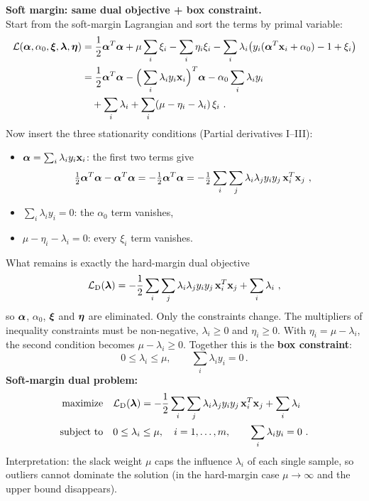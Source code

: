   \medskip
  \textbf{Soft margin: same dual objective + box constraint.} \\
  Start from the soft-margin Lagrangian and sort the terms by primal variable:
  {\small
  \begin{align*}
    \mathcal L(\bm{\mathrm{\alpha}},\alpha_0,\bm{\mathrm{\xi}},\bm{\mathrm{\lambda}},\bm{\mathrm{\eta}})
    &= \frac12\bm{\mathrm{\alpha}}^T\bm{\mathrm{\alpha}} + \mu\sum_i\xi_i - \sum_i\eta_i\xi_i - \sum_i\lambda_i\big(y_i(\bm{\mathrm{\alpha}}^T\bm{\mathrm{x}}_i+\alpha_0)-1+\xi_i\big)\\
    &= \frac12\bm{\mathrm{\alpha}}^T\bm{\mathrm{\alpha}} - \Big(\sum_i\lambda_i y_i\bm{\mathrm{x}}_i\Big)^T\bm{\mathrm{\alpha}} - \alpha_0\sum_i\lambda_i y_i\\
    &\quad + \sum_i\lambda_i + \sum_i(\mu-\eta_i-\lambda_i)\,\xi_i~.
  \end{align*}
  }
  Now insert the three stationarity conditions (Partial derivatives I--III):
  \begin{itemize}
    \item $\bm{\mathrm{\alpha}}=\sum_i\lambda_i y_i\bm{\mathrm{x}}_i$: the first two terms give
      \[ \tfrac12\bm{\mathrm{\alpha}}^T\bm{\mathrm{\alpha}}-\bm{\mathrm{\alpha}}^T\bm{\mathrm{\alpha}}=-\tfrac12\bm{\mathrm{\alpha}}^T\bm{\mathrm{\alpha}}=-\tfrac12\sum_i\sum_j\lambda_i\lambda_j y_iy_j\,\bm{\mathrm{x}}_i^T\bm{\mathrm{x}}_j~,\]
    \item $\sum_i\lambda_i y_i=0$: the $\alpha_0$ term vanishes,
    \item $\mu-\eta_i-\lambda_i=0$: every $\xi_i$ term vanishes.
  \end{itemize}
  What remains is exactly the hard-margin dual objective
  \[
    \mathcal L_\text{D}(\bm{\mathrm{\lambda}})=-\frac12\sum_i\sum_j\lambda_i\lambda_j y_iy_j\,\bm{\mathrm{x}}_i^T\bm{\mathrm{x}}_j+\sum_i\lambda_i~,
  \]
  so $\bm{\mathrm{\alpha}}$, $\alpha_0$, $\bm{\mathrm{\xi}}$ and $\bm{\mathrm{\eta}}$ are eliminated. Only the constraints change. The multipliers of inequality constraints must be non-negative, $\lambda_i\ge0$ and $\eta_i\ge0$. With $\eta_i=\mu-\lambda_i$, the second condition becomes $\mu-\lambda_i\ge0$. Together this is the \textbf{box constraint}:
  \[
    0\le \lambda_i \le \mu,\qquad \sum_i \lambda_i y_i = 0\,.
  \]
  \textbf{Soft-margin dual problem:}
  \begin{align*}
    \text{maximize}\quad & \mathcal L_\text{D}(\bm{\mathrm{\lambda}})=-\frac12\sum_i\sum_j\lambda_i\lambda_j y_iy_j\,\bm{\mathrm{x}}_i^T\bm{\mathrm{x}}_j+\sum_i\lambda_i\\
    \text{subject to}\quad & 0\le\lambda_i\le\mu,\quad i=1,\dots,m,\qquad \sum_i\lambda_i y_i=0~.
  \end{align*}
  Interpretation: the slack weight $\mu$ caps the influence $\lambda_i$ of each single sample, so outliers cannot dominate the solution (in the hard-margin case $\mu\to\infty$ and the upper bound disappears).

